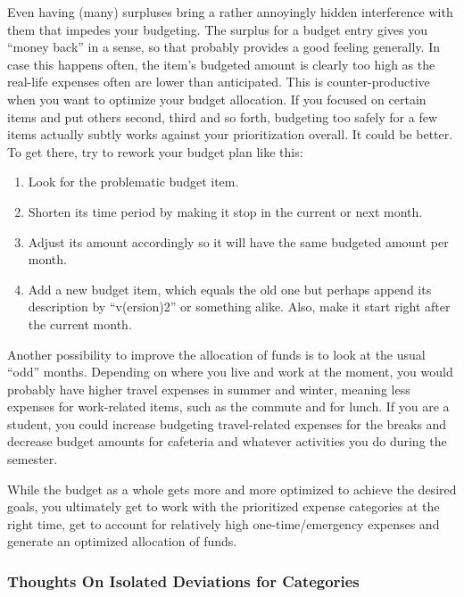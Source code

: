 Even having (many) surpluses bring a rather annoyingly hidden interference with them that impedes your budgeting.
The surplus for a budget entry gives you ``money back'' in a sense, so that probably provides a good feeling generally.
In case this happens often, the item's budgeted amount is clearly too high as the real-life expenses often are lower than anticipated.
This is counter-productive when you want to optimize your budget allocation.
If you focused on certain items and put others second, third and so forth, budgeting too safely for a few items actually subtly works against your prioritization overall.
It could be better.
To get there, try to rework your budget plan like this:
\begin{enumerate}
	\item Look for the problematic budget item.
	\item Shorten its time period by making it stop in the current or next month.
	\item Adjust its amount accordingly so it will have the same budgeted amount per month.
	\item Add a new budget item, which equals the old one but perhaps append its description by ``v(ersion)2'' or something alike.
	Also, make it start right after the current month.
\end{enumerate}

Another possibility to improve the allocation of funds is to look at the usual ``odd'' months.
Depending on where you live and work at the moment, you would probably have higher travel expenses in summer and winter, meaning less expenses for work-related items, such as the commute and for lunch.
If you are a student, you could increase budgeting travel-related expenses for the breaks and decrease budget amounts for cafeteria and whatever activities you do during the semester.

While the budget as a whole gets more and more optimized to achieve the desired goals, you ultimately get to work with the prioritized expense categories at the right time, get to account for relatively high one-time/emergency expenses and generate an optimized allocation of funds.

\subsubsection{Thoughts On Isolated Deviations for Categories}
\label{subsubsec:thoughts-on-isolated-deviations-for-categories}

